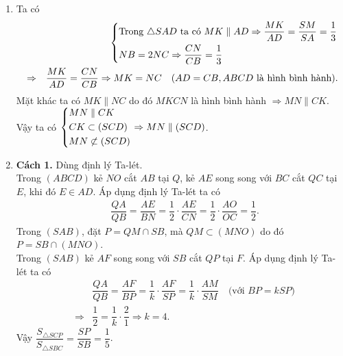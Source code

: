 \begin{bt}
{\begin{enumerate}
	\item Ta có 
	\begin{eqnarray*}
		&&\left\{\begin{aligned}&\text{Trong $ \triangle SAD $ ta có $ MK \parallel AD \Rightarrow 	 
			     \dfrac{MK}{AD} = \dfrac{SM}{SA} = \dfrac{1}{3} $} \\
		        &NB=2NC \Rightarrow \dfrac{CN}{CB} = \dfrac{1}{3}\end{aligned}\right. \\
	    & \Rightarrow & \dfrac{MK}{AD} = \dfrac{CN}{CB} \Rightarrow MK = NC \quad\text{($AD=CB,ABCD$ là hình bình hành)}.
	\end{eqnarray*}
	Mặt khác ta có $ MK \parallel NC $ do đó $ MKCN $ là hình bình hành 
	$ \Rightarrow MN \parallel CK $.\\
	Vậy ta có 
	$ \left\{\begin{aligned}&MN \parallel CK \\ &CK \subset (SCD) \\ &MN \not\subset (SCD)\end{aligned}\right. \Rightarrow MN \parallel (SCD) $. 
	
	\item 
	\textbf{Cách 1.} Dùng định lý Ta-lét. \\
	Trong $ (ABCD) $ kẻ $ NO $ cắt $ AB $	tại $ Q $, kẻ $ AE $ song song với $ BC $ cắt $ QC $ tại $ E $, khi đó $ E\in AD $. Áp dụng định lý Ta-lét ta có
	\begin{eqnarray*}
		& \dfrac{QA}{QB} = \dfrac{AE}{BN} 
			             = \dfrac{1}{2} \cdot \dfrac{AE}{CN}
			             = \dfrac{1}{2} \cdot \dfrac{AO}{OC}
			             = \dfrac{1}{2}.
	\end{eqnarray*}
	Trong $ (SAB) $, đặt $ P = QM \cap SB $, mà $ QM \subset (MNO) $ do đó $ P = SB \cap (MNO) $. \\
	Trong $ (SAB) $ kẻ $ AF $ song song với $ SB $ cắt $ QP $ tại $ F $. Áp dụng định lý Ta-lét ta có
	\begin{eqnarray*}
		& & \dfrac{QA}{QB} = \dfrac{AF}{BP}
						   = \dfrac{1}{k} \cdot \dfrac{AF}{SP}  
						   = \dfrac{1}{k} \cdot \dfrac{AM}{SM} 
						   \quad\text{(với $BP=kSP$)} \\
		& \Rightarrow & \dfrac{1}{2} = \dfrac{1}{k} \cdot \dfrac{2}{1} 
		\Rightarrow k=4.
	\end{eqnarray*}
	Vậy	 $ \dfrac{S_{\triangle SCP}}{S_{\triangle SBC}} = \dfrac{SP}{SB} = \dfrac{1}{5} $.
	

\end{enumerate}}
\end{bt}
